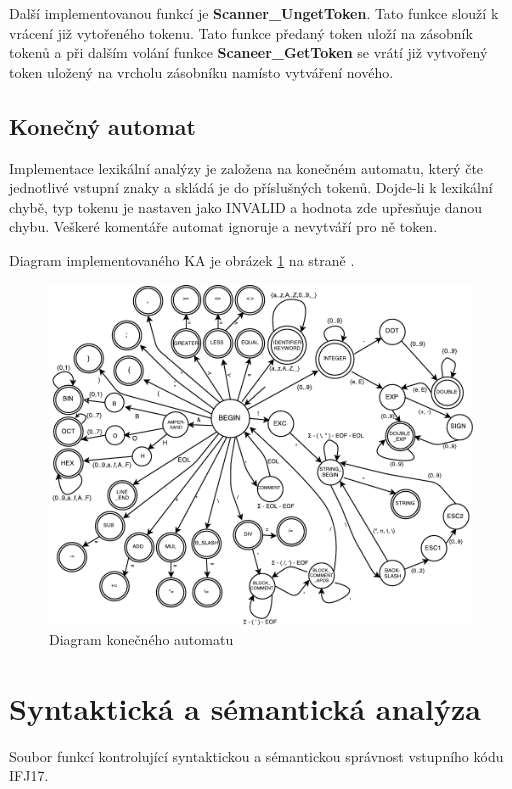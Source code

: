 \documentclass[a4paper,11pt]{article}
\begin{document}
\vspace{2mm}
Další implementovanou funkcí je \textbf{Scanner\_UngetToken}. Tato funkce slouží k vrácení již vytořeného tokenu. Tato funkce předaný token uloží na zásobník tokenů a při dalším volání funkce \textbf{Scaneer\_GetToken} se vrátí již vytvořený token uložený na vrcholu zásobníku namísto vytváření nového.

\subsection{Konečný automat} \label{lex-fa}
Implementace lexikální analýzy je založena na konečném automatu, který čte jednotlivé vstupní znaky a skládá je do příslušných tokenů. Dojde-li k lexikální chybě, typ tokenu je nastaven jako \textsf{INVALID} a hodnota zde upřesňuje danou chybu. Veškeré komentáře automat ignoruje a nevytváří pro ně token.

\vspace{2mm}
Diagram implementovaného KA je obrázek \ref{fig:automata} na straně \pageref{fig:automata}.

\begin{figure}[!htbp]
	\hspace*{-2cm}
	\includegraphics[width=17cm]{ka.pdf}
	\caption{Diagram konečného automatu}
	\label{fig:automata}
\end{figure}


\newpage
\section{Syntaktická a sémantická analýza} \label{syse}
Soubor funkcí kontrolující syntaktickou a sémantickou správnost vstupního kódu IFJ17.
\end{document}
